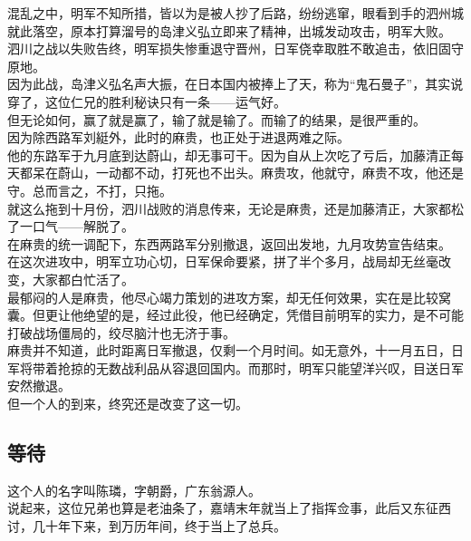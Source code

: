 \begin{multicols}{\theparacolNo}
混乱之中，明军不知所措，皆以为是被人抄了后路，纷纷逃窜，眼看到手的泗州城就此落空，原本打算溜号的岛津义弘立即来了精神，出城发动攻击，明军大败。\\

泗川之战以失败告终，明军损失惨重退守晋州，日军侥幸取胜不敢追击，依旧固守原地。\\

因为此战，岛津义弘名声大振，在日本国内被捧上了天，称为“鬼石曼子”，其实说穿了，这位仁兄的胜利秘诀只有一条——运气好。\\

但无论如何，赢了就是赢了，输了就是输了。而输了的结果，是很严重的。\\

因为除西路军刘綎外，此时的麻贵，也正处于进退两难之际。\\

他的东路军于九月底到达蔚山，却无事可干。因为自从上次吃了亏后，加藤清正每天都呆在蔚山，一动都不动，打死也不出头。麻贵攻，他就守，麻贵不攻，他还是守。总而言之，不打，只拖。\\

就这么拖到十月份，泗川战败的消息传来，无论是麻贵，还是加藤清正，大家都松了一口气——解脱了。\\

在麻贵的统一调配下，东西两路军分别撤退，返回出发地，九月攻势宣告结束。\\

在这次进攻中，明军立功心切，日军保命要紧，拼了半个多月，战局却无丝毫改变，大家都白忙活了。\\

最郁闷的人是麻贵，他尽心竭力策划的进攻方案，却无任何效果，实在是比较窝囊。但更让他绝望的是，经过此役，他已经确定，凭借目前明军的实力，是不可能打破战场僵局的，绞尽脑汁也无济于事。\\

麻贵并不知道，此时距离日军撤退，仅剩一个月时间。如无意外，十一月五日，日军将带着抢掠的无数战利品从容退回国内。而那时，明军只能望洋兴叹，目送日军安然撤退。\\

但一个人的到来，终究还是改变了这一切。\\

\subsection{等待}
这个人的名字叫陈璘，字朝爵，广东翁源人。\\

说起来，这位兄弟也算是老油条了，嘉靖末年就当上了指挥佥事，此后又东征西讨，几十年下来，到万历年间，终于当上了总兵。\\


\end{multicols}
